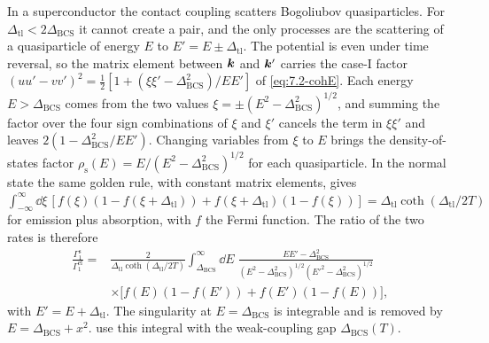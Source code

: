 In a superconductor the contact coupling scatters Bogoliubov quasiparticles. For $\Delta_{\mathrm{tl}} < 2\Delta_{\mathrm{BCS}}$ it cannot create a pair, and the only processes are the scattering of a quasiparticle of energy $E$ to $E' = E \pm \Delta_{\mathrm{tl}}$. The potential is even under time reversal, so the matrix element between $\bm{k}$ and $\bm{k}'$ carries the case-I factor $(uu' - vv')^2 = \tfrac12[1 + (\xi\xi' - \Delta_{\mathrm{BCS}}^2)/EE']$ of \cref{eq:7.2-cohE}. Each energy $E > \Delta_{\mathrm{BCS}}$ comes from the two values $\xi = \pm(E^2 - \Delta_{\mathrm{BCS}}^2)^{1/2}$, and summing the factor over the four sign combinations of $\xi$ and $\xi'$ cancels the term in $\xi\xi'$ and leaves $2(1 - \Delta_{\mathrm{BCS}}^2/EE')$. Changing variables from $\xi$ to $E$ brings the density-of-states factor $\rho_{\mathrm{s}}(E) = E/(E^2 - \Delta_{\mathrm{BCS}}^2)^{1/2}$ for each quasiparticle. In the normal state the same golden rule, with constant matrix elements, gives $\int_{-\infty}^\infty\dd\xi\,[f(\xi)(1 - f(\xi + \Delta_{\mathrm{tl}})) + f(\xi + \Delta_{\mathrm{tl}})(1 - f(\xi))] = \Delta_{\mathrm{tl}}\coth(\Delta_{\mathrm{tl}}/2T)$ for emission plus absorption, with $f$ the Fermi function. The ratio of the two rates is therefore
\begin{equation}
  \begin{split}
  \frac{\varGamma_1^{\mathrm{s}}}{\varGamma_1^{\mathrm{el}}} = {}&\frac{2}{\Delta_{\mathrm{tl}}\coth(\Delta_{\mathrm{tl}}/2T)}\int_{\Delta_{\mathrm{BCS}}}^\infty\dd E\;
  \frac{EE' - \Delta_{\mathrm{BCS}}^2}{(E^2 - \Delta_{\mathrm{BCS}}^2)^{1/2}(E'^2 - \Delta_{\mathrm{BCS}}^2)^{1/2}} \\
  &\times\bigl[f(E)(1 - f(E')) + f(E')(1 - f(E))\bigr] ,
  \end{split}
  \label{eq:D.42-Rs}
\end{equation}
with $E' = E + \Delta_{\mathrm{tl}}$. The singularity at $E = \Delta_{\mathrm{BCS}}$ is integrable and is removed by $E = \Delta_{\mathrm{BCS}} + x^2$.  use this integral with the weak-coupling gap $\Delta_{\mathrm{BCS}}(T)$.

